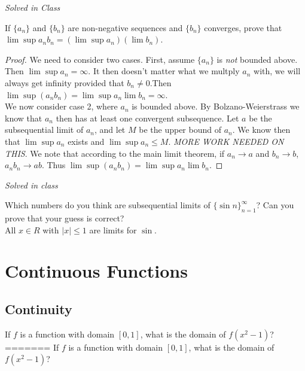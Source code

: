\documentclass[12pt]{book}
\newenvironment{exercise}[2][Exercise]{\begin{trivlist}
\item[\hskip \labelsep {\bfseries #1}\hskip \labelsep {\bfseries #2.}]}{\end{trivlist}}
\begin{document}
\begin{exercise}{1.4.6}
\begin{exercise}{2.6.7}
\emph{Solved in Class}
\end{exercise}

\begin{exercise}{2.6.8}
If $\{a_n\}$ and $\{b_n\}$ are non-negative sequences and $\{b_n\}$ converges, prove that $\lim \sup a_n b_n= (\lim \sup a_n) (\lim b_n)$.

	\begin{proof}
	We need to consider two cases. First, assume $\{a_n\}$ is \emph{not} bounded above. Then $\lim \sup a_n  = \infty$. It then doesn't matter what we multply $a_n$ with, we will always get infinity provided that $b_n \neq 0$.Then $\lim \sup (a_n b_n) = \lim \sup a_n \lim b_n = \infty$. \\
	We now consider case 2, where $a_n$ is bounded above. By Bolzano-Weierstrass we know that $a_n$ then has at least one convergent subsequence. Let $a$ be the subsequential limit of $a_n$, and let $M$ be the upper bound of $a_n$. We know then that $\lim \sup a_n$ exists and $\lim \sup a_n \leq M$. \emph{MORE WORK NEEDED ON THIS}. We note that according to the main limit theorem, if $a_n \to a$ and $b_n \to b$, $a_n b_n \to a b$. Thus $\lim \sup (a_n b_n) = \lim \sup a_n \lim b_n$.
	\end{proof}
\end{exercise}


\begin{exercise}{2.6.9}
\emph{Solved in class}
\end{exercise}


\begin{exercise}{2.6.12}
Which numbers do you think are subsequential limits of $\{ \sin n\}_{n=1}^\infty$? Can you prove that your guess is correct? \\

All $x \in R$ with $|x| \leq 1$ are limits for $\sin$.
\end{exercise}



\chapter{Continuous Functions}
\section{Continuity}

\begin{exercise}{3.1.1}
If $f$ is a function with domain $[0,1]$, what is the domain of $f(x^2-1)$?\\
=======
    If $f$ is a function with domain $[0,1]$, what is the domain of $f(x^2 -1)$? \\
    

\end{exercise}
\end{exercise}
\end{document}

